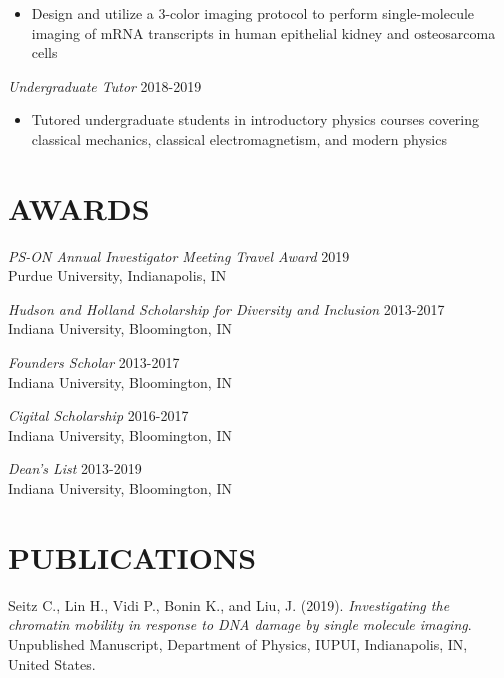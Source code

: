 \documentclass[margin, 10pt]{res} %
\begin{document}
\begin{resume}
\begin{itemize}
\item Design and utilize a 3-color imaging protocol to perform single-molecule imaging of mRNA transcripts in human epithelial kidney and osteosarcoma cells 

\end{itemize} 


{\sl Undergraduate Tutor} \hfill 2018-2019
\begin{itemize} \itemsep -2pt %

\item Tutored undergraduate students in introductory physics courses covering classical mechanics, classical electromagnetism, and modern physics

\end{itemize} 


\section{AWARDS}

{\sl PS-ON Annual Investigator Meeting Travel Award} \hfill 2019 \\
Purdue University, Indianapolis, IN 

{\sl Hudson and Holland Scholarship for Diversity and Inclusion} \hfill 2013-2017 \\
Indiana University, Bloomington, IN 

{\sl Founders Scholar} \hfill 2013-2017 \\
Indiana University, Bloomington, IN 

{\sl Cigital Scholarship} \hfill 2016-2017 \\
Indiana University, Bloomington, IN 

{\sl Dean’s List} \hfill 2013-2019 \\
Indiana University, Bloomington, IN 

\section{PUBLICATIONS}

Seitz C., Lin H., Vidi P., Bonin K., and Liu, J. (2019). \textit{Investigating the chromatin mobility in response to DNA damage by single molecule imaging}. Unpublished Manuscript, Department of Physics, IUPUI, Indianapolis, IN, United States.


\end{resume}
\end{document}
